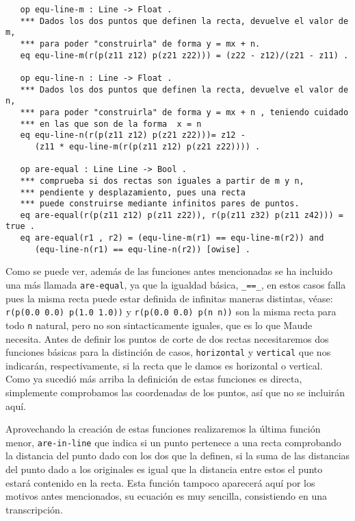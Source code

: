 {\codesize
\begin{verbatim}
   op equ-line-m : Line -> Float .
   *** Dados los dos puntos que definen la recta, devuelve el valor de m, 
   *** para poder "construirla" de forma y = mx + n.
   eq equ-line-m(r(p(z11 z12) p(z21 z22))) = (z22 - z12)/(z21 - z11) .

   op equ-line-n : Line -> Float .
   *** Dados los dos puntos que definen la recta, devuelve el valor de n, 
   *** para poder "construirla" de forma y = mx + n , teniendo cuidado 
   *** en las que son de la forma  x = n
   eq equ-line-n(r(p(z11 z12) p(z21 z22)))= z12 - 
      (z11 * equ-line-m(r(p(z11 z12) p(z21 z22)))) .

   op are-equal : Line Line -> Bool .
   *** comprueba si dos rectas son iguales a partir de m y n, 
   *** pendiente y desplazamiento, pues una recta
   *** puede construirse mediante infinitos pares de puntos.
   eq are-equal(r(p(z11 z12) p(z11 z22)), r(p(z11 z32) p(z11 z42))) = true . 
   eq are-equal(r1 , r2) = (equ-line-m(r1) == equ-line-m(r2)) and 
      (equ-line-n(r1) == equ-line-n(r2)) [owise] .
\end{verbatim}
}

Como se puede ver, además de las funciones antes mencionadas se ha incluido una más llamada \texttt{are-equal}, ya que la igualdad básica, \verb"_==_", en estos casos falla pues la misma recta puede estar definida de infinitas maneras distintas, véase: \texttt{r(p(0.0 0.0) p(1.0 1.0))} y \texttt{r(p(0.0 0.0) p(n n))} son la misma recta para todo \texttt{n} natural, pero no son sintacticamente iguales, que es lo que Maude necesita. Antes de definir los puntos de corte de dos rectas necesitaremos dos funciones básicas para la distinción de casos, \texttt{horizontal} y \texttt{vertical} que nos indicarán, respectivamente, si la recta que le damos es horizontal o vertical. Como ya sucedió más arriba la definición de estas funciones es directa, simplemente comprobamos las coordenadas de los puntos, así que no se incluirán aquí.\par
Aprovechando la creación de estas funciones realizaremos la última función menor, \texttt{are-in-line} que indica si un punto pertenece a una recta comprobando la distancia del punto dado con los dos que la definen, si la suma de las distancias del punto dado a los originales es igual que la distancia entre estos el punto estará contenido en la recta. Esta función tampoco aparecerá aquí por los motivos antes mencionados, su ecuación es muy sencilla, consistiendo en una transcripción.\par

